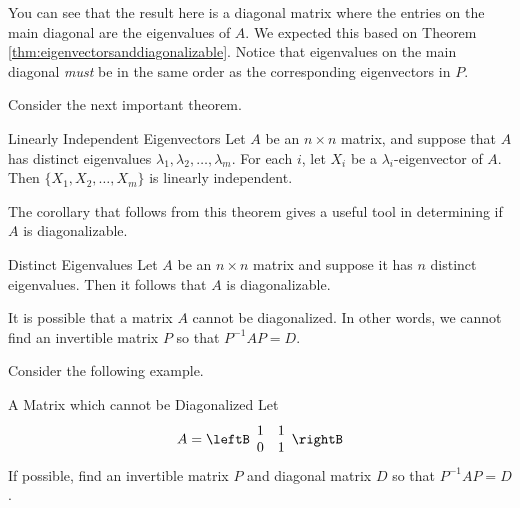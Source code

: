 \begin{solution}
You can see that the result here is a diagonal matrix where the entries on the main diagonal are the eigenvalues of $A$. We expected this based on 
Theorem \ref{thm:eigenvectorsanddiagonalizable}. Notice that eigenvalues on the main diagonal {\em must\em} be in the same order as the corresponding eigenvectors in $P$. 
\end{solution}

Consider the next important theorem.

\begin{theorem}{Linearly Independent Eigenvectors}\label{thm:linindepeigenvectors}
Let $A$ be an $n\times n$ matrix, and suppose that $A$ 
has distinct eigenvalues $\lambda_1, \lambda_2, \ldots, \lambda_m$.
For each $i$, let $X_i$ be a $\lambda_i$-eigenvector of $A$.
Then $\{ X_1, X_2, \ldots, X_m\}$ is 
linearly independent.
\end{theorem}

The corollary that follows from this theorem gives a useful tool in determining if $A$ is diagonalizable. 

\begin{corollary}{Distinct Eigenvalues}\label{cor:distincteigenvalues}
Let $A$ be an $n \times n$ matrix and suppose it has $n$ distinct eigenvalues. Then it follows that $A$ is diagonalizable.
\end{corollary}

It is possible that a matrix $A$ cannot be diagonalized. In other words, we cannot find an invertible matrix $P$ so that $P^{-1}AP=D$.

Consider the following example. 

\begin{example}{A Matrix which cannot be Diagonalized}\label{exa:impossiblediagonalize}
Let
\begin{equation*}
A = 
\leftB
\begin{array}{rr}
1 & 1 \\
0 & 1
\end{array}
\rightB
\end{equation*}
If possible, find an invertible matrix $P$ and diagonal matrix $D$ so that $P^{-1}AP=D$.
\end{example}

